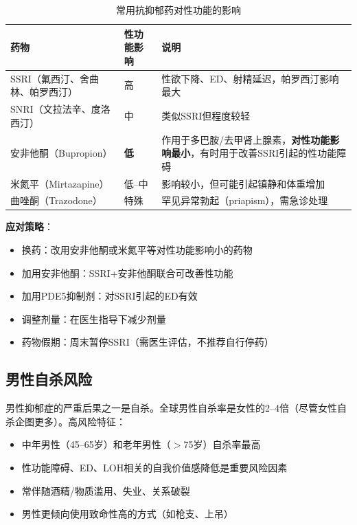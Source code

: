 \begin{table}[htbp]
\centering
\caption{常用抗抑郁药对性功能的影响}
\label{tab:antidepressants_sexual}
\begin{tabularx}{\textwidth}{@{}llX@{}}
    \toprule
    \textbf{药物} & \textbf{性功能影响} & \textbf{说明} \\
    \midrule
    SSRI（氟西汀、舍曲林、帕罗西汀） & 高 & 性欲下降、ED、射精延迟，帕罗西汀影响最大 \\
    SNRI（文拉法辛、度洛西汀） & 中 & 类似SSRI但程度较轻 \\
    安非他酮（Bupropion） & \textbf{低} & 作用于多巴胺/去甲肾上腺素，\textbf{对性功能影响最小}，有时用于改善SSRI引起的性功能障碍 \\
    米氮平（Mirtazapine） & 低--中 & 影响较小，但可能引起镇静和体重增加 \\
    曲唑酮（Trazodone） & 特殊 & 罕见异常勃起（priapism），需急诊处理 \\
    \bottomrule
\end{tabularx}
\end{table}

\textbf{应对策略}：
\begin{itemize}[leftmargin=2cm]
	\item 换药：改用安非他酮或米氮平等对性功能影响小的药物
	\item 加用安非他酮：SSRI+安非他酮联合可改善性功能
	\item 加用PDE5抑制剂：对SSRI引起的ED有效
	\item 调整剂量：在医生指导下减少剂量
	\item 药物假期：周末暂停SSRI（需医生评估，不推荐自行停药）
\end{itemize}

\subsection{男性自杀风险}

男性抑郁症的严重后果之一是自杀。全球男性自杀率是女性的2--4倍（尽管女性自杀企图更多）。高风险特征：

\begin{itemize}[leftmargin=2cm]
	\item 中年男性（45--65岁）和老年男性（$>$75岁）自杀率最高
	\item 性功能障碍、ED、LOH相关的自我价值感降低是重要风险因素
	\item 常伴随酒精/物质滥用、失业、关系破裂
	\item 男性更倾向使用致命性高的方式（如枪支、上吊）
\end{itemize}

